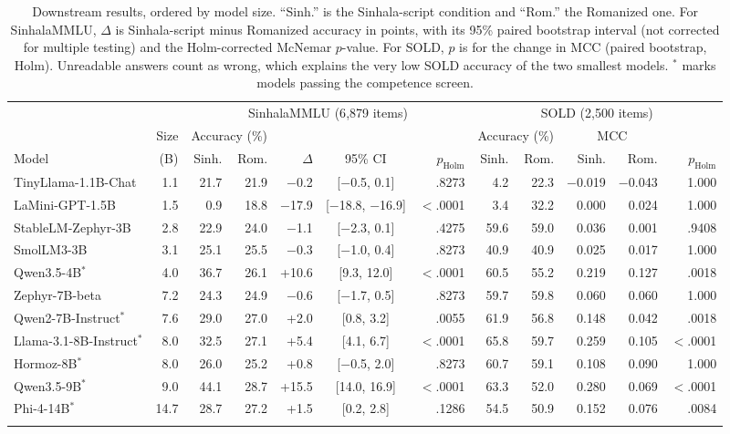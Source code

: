 \documentclass[3p,times,procedia]{elsarticle}
\begin{document}
\begin{table}[t]
\caption{Downstream results, ordered by model size. ``Sinh.'' is the Sinhala-script condition and ``Rom.'' the Romanized one. For SinhalaMMLU, $\Delta$ is Sinhala-script minus Romanized accuracy in points, with its 95\% paired bootstrap interval (not corrected for multiple testing) and the Holm-corrected McNemar $p$-value. For SOLD, $p$ is for the change in MCC (paired bootstrap, Holm). Unreadable answers count as wrong, which explains the very low SOLD accuracy of the two smallest models. $^{*}$ marks models passing the competence screen.}
\label{tab:main}
{\footnotesize
\begin{tabular*}{\hsize}{@{\extracolsep{\fill}}lrrrrcrrrrrr@{}}
\toprule
& & \multicolumn{5}{c}{SinhalaMMLU (6{,}879 items)} & \multicolumn{5}{c}{SOLD (2{,}500 items)} \\
\cline{3-7}\cline{8-12}
& Size & \multicolumn{2}{c}{Accuracy (\%)} & & & & \multicolumn{2}{c}{Accuracy (\%)} & \multicolumn{2}{c}{MCC} & \\
\cline{3-4}\cline{8-9}\cline{10-11}
Model & (B) & Sinh. & Rom. & $\Delta$ & 95\% CI & $p_{\text{Holm}}$ & Sinh. & Rom. & Sinh. & Rom. & $p_{\text{Holm}}$ \\
\colrule
TinyLlama-1.1B-Chat & 1.1 & 21.7 & 21.9 & $-$0.2 & [$-$0.5, 0.1] & .8273 & 4.2 & 22.3 & $-$0.019 & $-$0.043 & 1.000 \\
LaMini-GPT-1.5B & 1.5 & 0.9 & 18.8 & $-$17.9 & [$-$18.8, $-$16.9] & $<$.0001 & 3.4 & 32.2 & 0.000 & 0.024 & 1.000 \\
StableLM-Zephyr-3B & 2.8 & 22.9 & 24.0 & $-$1.1 & [$-$2.3, 0.1] & .4275 & 59.6 & 59.0 & 0.036 & 0.001 & .9408 \\
SmolLM3-3B & 3.1 & 25.1 & 25.5 & $-$0.3 & [$-$1.0, 0.4] & .8273 & 40.9 & 40.9 & 0.025 & 0.017 & 1.000 \\
Qwen3.5-4B$^{*}$ & 4.0 & 36.7 & 26.1 & +10.6 & [9.3, 12.0] & $<$.0001 & 60.5 & 55.2 & 0.219 & 0.127 & .0018 \\
Zephyr-7B-beta & 7.2 & 24.3 & 24.9 & $-$0.6 & [$-$1.7, 0.5] & .8273 & 59.7 & 59.8 & 0.060 & 0.060 & 1.000 \\
Qwen2-7B-Instruct$^{*}$ & 7.6 & 29.0 & 27.0 & +2.0 & [0.8, 3.2] & .0055 & 61.9 & 56.8 & 0.148 & 0.042 & .0018 \\
Llama-3.1-8B-Instruct$^{*}$ & 8.0 & 32.5 & 27.1 & +5.4 & [4.1, 6.7] & $<$.0001 & 65.8 & 59.7 & 0.259 & 0.105 & $<$.0001 \\
Hormoz-8B$^{*}$ & 8.0 & 26.0 & 25.2 & +0.8 & [$-$0.5, 2.0] & .8273 & 60.7 & 59.1 & 0.108 & 0.090 & 1.000 \\
Qwen3.5-9B$^{*}$ & 9.0 & 44.1 & 28.7 & +15.5 & [14.0, 16.9] & $<$.0001 & 63.3 & 52.0 & 0.280 & 0.069 & $<$.0001 \\
Phi-4-14B$^{*}$ & 14.7 & 28.7 & 27.2 & +1.5 & [0.2, 2.8] & .1286 & 54.5 & 50.9 & 0.152 & 0.076 & .0084 \\
\botrule
\end{tabular*}}
\end{table}
\end{document}
